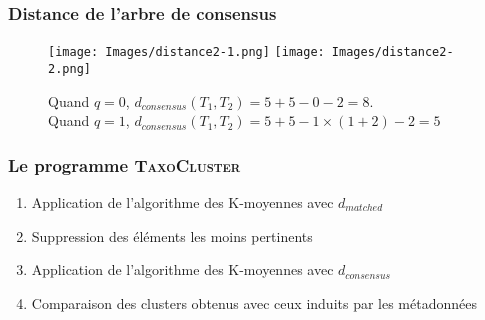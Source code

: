 \documentclass{beamer}
\begin{document}
\begin{frame}
\frametitle{Distance de l'arbre de consensus}

\begin{figure}
\centering
\subfigure\texttt{[image: Images/distance2-1.png]}
\subfigure\texttt{[image: Images/distance2-2.png]}
\caption{Quand $q = 0$, $d_{consensus}(T_{1},T_{2}) = 5 + 5 - 0 - 2 = 8$.\\Quand $q = 1$, $d_{consensus}(T_{1},T_{2}) = 5 + 5 - 1 \times (1 + 2) - 2 = 5$}
\end{figure}

\end{frame}

\begin{frame}
\frametitle{Le programme \textsc{\bf TaxoCluster}}



\begin{enumerate}
\item Application de l'algorithme des K-moyennes avec $d_{matched}$
\bigskip
\pause
\item Suppression des éléments les moins pertinents 
\bigskip
\pause
\item Application de l'algorithme des K-moyennes avec $d_{consensus}$
\bigskip
\pause
\item Comparaison des \alert{clusters} obtenus avec ceux induits par les métadonnées
\end{enumerate}

\end{frame}
\end{document}
